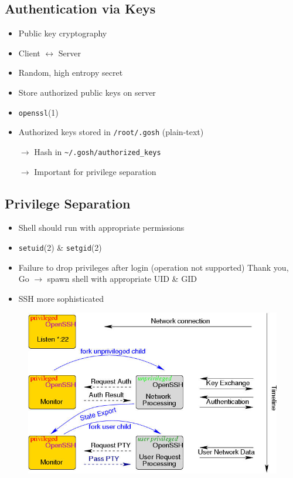 \documentclass[
	xcolor=dvipsnames,
]{beamer}
\newenvironment{zhawframe}[1][]
{\begin{frame}[environment=fr,#1]{\insertsectionhead}{\insertsubsectionhead}}
{\end{frame}
}
\begin{document}
\subsection{Authentication via Keys}
\begin{zhawframe}
\begin{itemize}
\item<1-> Public key cryptography
\item<2-> Client $\leftrightarrow$ Server
\item<3-> Random, high entropy secret
\item<4-> Store authorized public keys on server
\item<5-> \texttt{openssl}(1)
\item<6-> Authorized keys stored in \texttt{/root/.gosh} (plain-text)

$\rightarrow$ Hash in \texttt{\textasciitilde{}/.gosh/authorized\_{}keys}

$\rightarrow$ Important for privilege separation
\end{itemize}
\end{zhawframe}

\subsection{Privilege Separation}
\begin{zhawframe}
\begin{itemize}
\item<1-> Shell should run with appropriate permissions
\item<2-> \texttt{setuid}(2) \& \texttt{setgid}(2)
\item<3-> Failure to drop privileges after login (operation not supported)  Thank you, Go $\rightarrow$ spawn shell with appropriate UID \& GID
\item<6-> SSH more sophisticated
\end{itemize}
\end{zhawframe}

\begin{zhawframe}
\begin{figure}[ht]
\includegraphics[width=\textwidth]{priv}
\end{figure}
\end{zhawframe}
\end{document}
